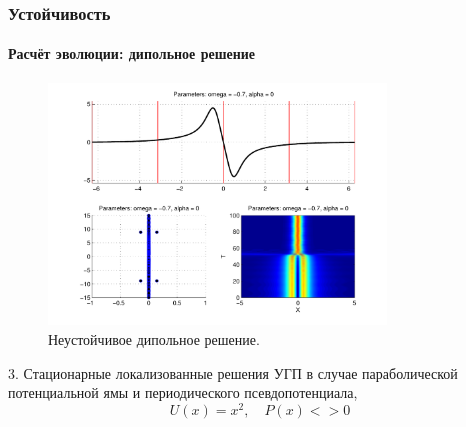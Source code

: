 \documentclass [10pt] {beamer}
\begin{document}
\begin{frame}
	\frametitle{Устойчивость}
	\framesubtitle{Расчёт эволюции: дипольное решение}
	
	\begin{figure}
		\includegraphics[width=0.8\textwidth]{pic/dipole_solution_unstable.pdf}
		\caption{Неустойчивое дипольное решение.}
		\label{pic:dipole_solution_unstable}
	\end{figure}
\end{frame}

\begin{frame}
	\begin{center}
		{\LARGE 3. Стационарные локализованные решения УГП в случае параболической потенциальной ямы и периодического псевдопотенциала, $$U(x) = x^2, \quad P(x) <> 0$$}
	\end{center}
\end{frame}
\end{document}
